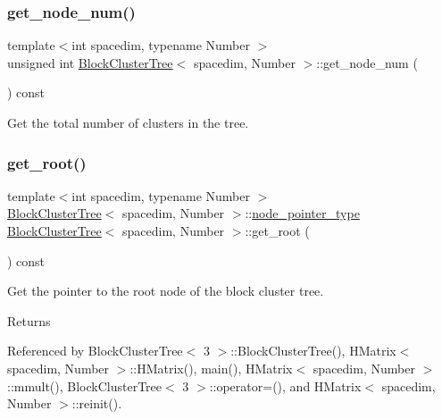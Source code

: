 \subsubsection{\texorpdfstring{get\+\_\+node\+\_\+num()}{get\_node\_num()}}
{\footnotesize\ttfamily template$<$int spacedim, typename Number $>$ \\
unsigned int \hyperlink{classBlockClusterTree}{Block\+Cluster\+Tree}$<$ spacedim, Number $>$\+::get\+\_\+node\+\_\+num (\begin{DoxyParamCaption}{ }\end{DoxyParamCaption}) const}

Get the total number of clusters in the tree. \mbox{\label{classBlockClusterTree_a4a4f3b893380d1d7f53b772589a847d2}} 
\subsubsection{\texorpdfstring{get\+\_\+root()}{get\_root()}}
{\footnotesize\ttfamily template$<$int spacedim, typename Number $>$ \\
\hyperlink{classBlockClusterTree}{Block\+Cluster\+Tree}$<$ spacedim, Number $>$\+::\hyperlink{classTreeNode}{node\+\_\+pointer\+\_\+type} \hyperlink{classBlockClusterTree}{Block\+Cluster\+Tree}$<$ spacedim, Number $>$\+::get\+\_\+root (\begin{DoxyParamCaption}{ }\end{DoxyParamCaption}) const}

Get the pointer to the root node of the block cluster tree. \begin{DoxyReturn}{Returns}

\end{DoxyReturn}


Referenced by Block\+Cluster\+Tree$<$ 3 $>$\+::\+Block\+Cluster\+Tree(), H\+Matrix$<$ spacedim, Number $>$\+::\+H\+Matrix(), main(), H\+Matrix$<$ spacedim, Number $>$\+::mmult(), Block\+Cluster\+Tree$<$ 3 $>$\+::operator=(), and H\+Matrix$<$ spacedim, Number $>$\+::reinit().

\mbox{\label{classBlockClusterTree_aec9920e5b215fbfe2aa9f54980d3b30a}} 
